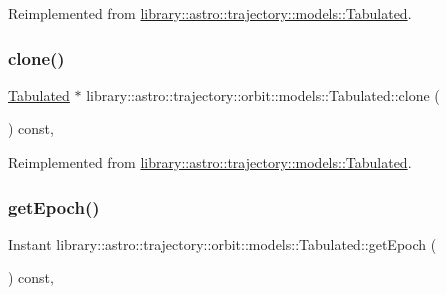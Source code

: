 Reimplemented from \hyperlink{classlibrary_1_1astro_1_1trajectory_1_1models_1_1_tabulated_a6d23f5721930d9e885eb3b763ab3390a}{library\+::astro\+::trajectory\+::models\+::\+Tabulated}.

\mbox{\label{classlibrary_1_1astro_1_1trajectory_1_1orbit_1_1models_1_1_tabulated_a8ccec23a49086c6c3fbda2cc81e7a4dc}} 
\subsubsection{\texorpdfstring{clone()}{clone()}}
{\footnotesize\ttfamily \hyperlink{classlibrary_1_1astro_1_1trajectory_1_1orbit_1_1models_1_1_tabulated}{Tabulated} $\ast$ library\+::astro\+::trajectory\+::orbit\+::models\+::\+Tabulated\+::clone (\begin{DoxyParamCaption}{ }\end{DoxyParamCaption}) const\hspace{0.3cm}{\ttfamily [override]}, {\ttfamily [virtual]}}



Reimplemented from \hyperlink{classlibrary_1_1astro_1_1trajectory_1_1models_1_1_tabulated_a192cfb0ceb4a11d02578adc9702cabc1}{library\+::astro\+::trajectory\+::models\+::\+Tabulated}.

\mbox{\label{classlibrary_1_1astro_1_1trajectory_1_1orbit_1_1models_1_1_tabulated_a9e12e7f7b79bf8d2d37494ff7a55ae1d}} 
\subsubsection{\texorpdfstring{get\+Epoch()}{getEpoch()}}
{\footnotesize\ttfamily Instant library\+::astro\+::trajectory\+::orbit\+::models\+::\+Tabulated\+::get\+Epoch (\begin{DoxyParamCaption}{ }\end{DoxyParamCaption}) const\hspace{0.3cm}{\ttfamily [override]}, {\ttfamily [virtual]}}



